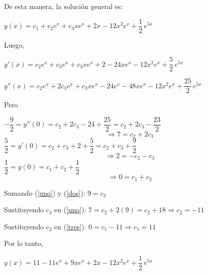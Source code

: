 \documentclass[fleqn]{article}
\begin{document}
    De esta manera, la solución general es:

    $ y(x) = c_1 + c_2e^x + c_3xe^x + 2x - 12x^2e^x + \dfrac{1}{2} \, e^{5x} $

    Luego,

    $ y'(x) = c_2e^x + c_3e^x + c_3xe^x + 2 - 24xe^x - 12x^2e^x + \dfrac{5}{2} \, e^{5x} $

    $ y''(x) = c_2e^x + 2c_3e^x + c_3xe^x - 24e^x - 48xe^x - 12x^2e^x + \dfrac{25}{2} \, e^{5x} $

    Pero

    $ - \dfrac{9}{2} = y''(0) = c_2 + 2c_3 - 24 + \dfrac{25}{2} = c_2 + 2c_3 - \dfrac{23}{2} $
    \begin{equation}
        \label{uno}
        \Longrightarrow 7 = c_2 + 2c_3
    \end{equation}
    $ \dfrac{5}{2} = y'(0) = c_2 + c_3 + 2 + \dfrac{5}{2} = c_2 + c_3 + \dfrac{9}{2} $
    \begin{equation}
        \label{dos}
        \Longrightarrow 2 = -c_2 - c_3
    \end{equation}
    $ \dfrac{1}{2} = y(0) = c_1 + c_2 + \dfrac{1}{2} $
    \begin{equation}
        \label{tres}
        \Longrightarrow 0 = c_1 + c_2
    \end{equation}

    Sumando (\ref{uno}) y (\ref{dos}): $ 9 = c_3 $

    Sustituyendo $ c_3 $ en (\ref{uno}): $ 7 = c_2 + 2(9) = c_2 + 18 \Longrightarrow c_2 = -11 $

    Sustituyendo $ c_2 $ en (\ref{tres}): $ 0 = c_1 - 11 \Longrightarrow c_1 = 11 $

    Por lo tanto, 

    $ y(x) = 11 - 11e^x + 9xe^x + 2x - 12x^2e^x + \dfrac{1}{2} \, e^{5x} $
    
\end{document}
